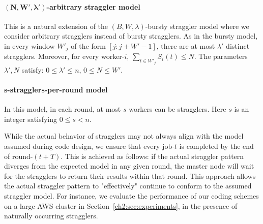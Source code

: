 
\paragraph{$\boldsymbol{(N,W',\lambda')}$-arbitrary straggler model}  This is a natural extension of the $(B,W,\lambda)$-bursty straggler model where we consider arbitrary stragglers instead of bursty stragglers. As in the bursty model, in every window $W'_j$ of the form $[j:j+W'-1]$, there are at most $\lambda'$ distinct stragglers. Moreover, for every worker-$i$, $\sum_{t\in W'_j}S_i(t)\leq N$. The parameters $\lambda',N$ satisfy: $0\leq \lambda'\leq n$, $0\leq N\leq W'$.

\paragraph{$\boldsymbol{s}$-stragglers-per-round model} In this model, in each round, at most $s$ workers can be stragglers. Here $s$ is an integer satisfying $0\leq s<n$. 

\begin{remark}
    \label{ch2:rem:straggler}\normalfont
    
    While the actual behavior of stragglers may not always align with the model assumed during code design, we ensure that every job-$t$ is completed by the end of round-$(t+T)$. This is achieved as follows: if the actual straggler pattern diverges from the expected model in any given round, the master node will wait for the stragglers to return their results within that round. This approach allows the actual straggler pattern to "effectively" continue to conform to the assumed straggler model. For instance, we evaluate the performance of our coding schemes on a large AWS cluster in Section~\ref{ch2:sec:experiments}, in the presence of naturally occurring stragglers.
    
\end{remark}


